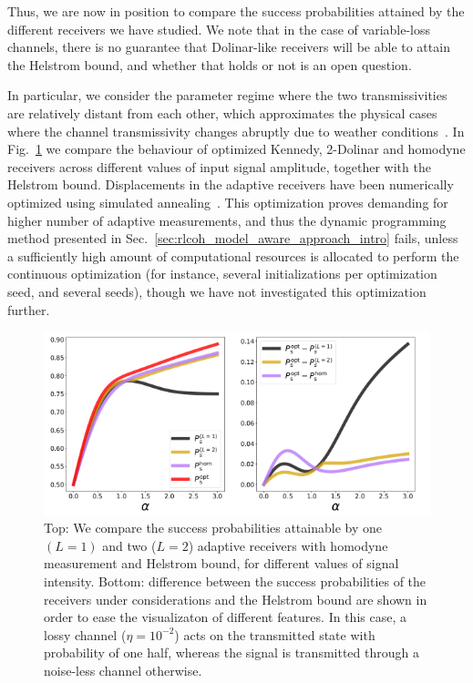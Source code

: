 Thus, we are now in position to compare the success probabilities attained by the different receivers we have studied. We note that in the case of variable-loss channels, there is no guarantee that Dolinar-like receivers will be able to attain the Helstrom bound, and whether that holds or not is an open question.

In particular, we consider the parameter regime where the two transmissivities are relatively distant from each other, which approximates the physical cases where the channel transmissivity changes abruptly due to weather conditions~\cite{Vasylyev2017}. In Fig.~\ref{fig:benchmark} we compare the behaviour of optimized Kennedy, 2-Dolinar and homodyne receivers across different values of input signal amplitude, together with the Helstrom bound. Displacements in the adaptive receivers have been numerically optimized using simulated annealing~\cite{dual_annealing, scipy}. This optimization proves demanding for higher number of adaptive measurements, and thus the dynamic programming method presented in Sec.~\ref{sec:rlcoh_model_aware_approach_intro} fails, unless a sufficiently high amount of computational resources is allocated to perform the continuous optimization (for instance, several initializations per optimization seed, and several seeds), though we have not investigated this optimization further.

\begin{figure}[t!]
   \centering
   \includegraphics[width=1.\textwidth]{Figures/318/singleetas[0.01, 1]_wdiffe_.pdf}
   \caption{Top: We compare the success probabilities attainable by one $(L=1)$ and two ($L=2$) adaptive receivers with homodyne measurement and Helstrom bound, for different values of signal intensity. Bottom: difference between the success probabilities of the receivers under considerations and the Helstrom bound are shown in order to ease the visualizaton of different features. In this case, a lossy channel ($\eta=10^{-2}$) acts on the transmitted state with probability of one half, whereas the signal is transmitted through a noise-less channel otherwise. }
   \label{fig:benchmark}
\end{figure}

